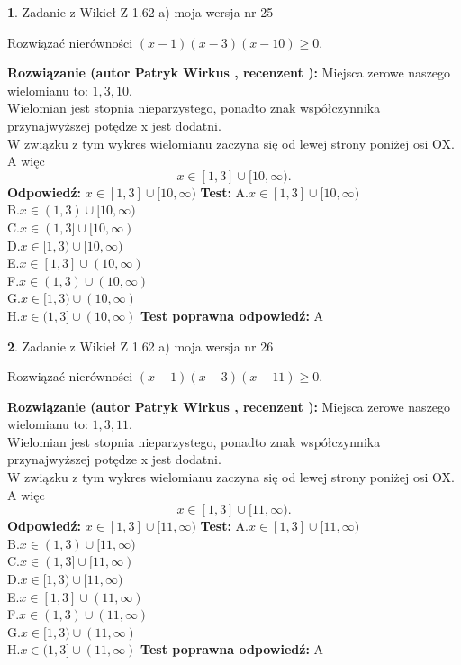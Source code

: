 \documentclass[12pt, a4paper]{article}
\theoremstyle{definition} %
\newtheorem{zad}{}
\newcommand{\zadStart}[1]{\begin{zad}#1\newline}
\newcommand{\zadStop}{\end{zad}}
\newcommand{\rozwStart}[2]{\noindent \textbf{Rozwiązanie (autor #1 , recenzent #2): }\newline}
\newcommand{\rozwStop}{\newline}
\newcommand{\odpStart}{\noindent \textbf{Odpowiedź:}\newline}
\newcommand{\odpStop}{\newline}
\newcommand{\testStart}{\noindent \textbf{Test:}\newline}
\newcommand{\testStop}{\newline}
\newcommand{\kluczStart}{\noindent \textbf{Test poprawna odpowiedź:}\newline}
\newcommand{\kluczStop}{\newline}
\begin{document}
\zadStart{Zadanie z Wikieł Z 1.62 a) moja wersja nr 25}

Rozwiązać nierówności $(x-1)(x-3)(x-10)\ge0$.
\zadStop
\rozwStart{Patryk Wirkus}{}
Miejsca zerowe naszego wielomianu to: $1, 3, 10$.\\
Wielomian jest stopnia nieparzystego, ponadto znak współczynnika przy\linebreak najwyższej potędze x jest dodatni.\\ W związku z tym wykres wielomianu zaczyna się od lewej strony poniżej osi OX. A więc $$x \in [1,3] \cup [10,\infty).$$
\rozwStop
\odpStart
$x \in [1,3] \cup [10,\infty)$
\odpStop
\testStart
A.$x \in [1,3] \cup [10,\infty)$\\
B.$x \in (1,3) \cup [10,\infty)$\\
C.$x \in (1,3] \cup [10,\infty)$\\
D.$x \in [1,3) \cup [10,\infty)$\\
E.$x \in [1,3] \cup (10,\infty)$\\
F.$x \in (1,3) \cup (10,\infty)$\\
G.$x \in [1,3) \cup (10,\infty)$\\
H.$x \in (1,3] \cup (10,\infty)$
\testStop
\kluczStart
A
\kluczStop



\zadStart{Zadanie z Wikieł Z 1.62 a) moja wersja nr 26}

Rozwiązać nierówności $(x-1)(x-3)(x-11)\ge0$.
\zadStop
\rozwStart{Patryk Wirkus}{}
Miejsca zerowe naszego wielomianu to: $1, 3, 11$.\\
Wielomian jest stopnia nieparzystego, ponadto znak współczynnika przy\linebreak najwyższej potędze x jest dodatni.\\ W związku z tym wykres wielomianu zaczyna się od lewej strony poniżej osi OX. A więc $$x \in [1,3] \cup [11,\infty).$$
\rozwStop
\odpStart
$x \in [1,3] \cup [11,\infty)$
\odpStop
\testStart
A.$x \in [1,3] \cup [11,\infty)$\\
B.$x \in (1,3) \cup [11,\infty)$\\
C.$x \in (1,3] \cup [11,\infty)$\\
D.$x \in [1,3) \cup [11,\infty)$\\
E.$x \in [1,3] \cup (11,\infty)$\\
F.$x \in (1,3) \cup (11,\infty)$\\
G.$x \in [1,3) \cup (11,\infty)$\\
H.$x \in (1,3] \cup (11,\infty)$
\testStop
\kluczStart
A
\kluczStop
\end{document}

